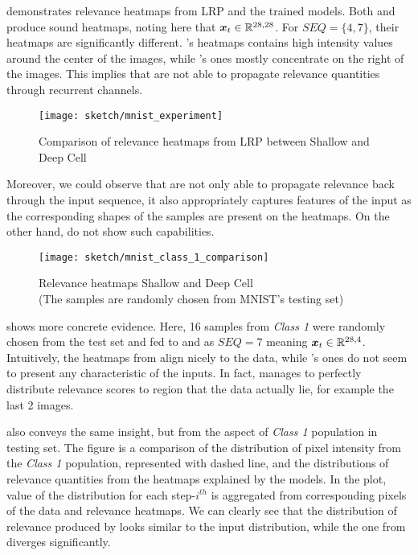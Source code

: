 \addfigure{\ref{fig:mnist_experiment}} demonstrates relevance heatmaps from LRP and the trained models. Both   and  produce sound heatmaps, noting here that $\patvector{x}_t \in \mathbb{R}^{28,28}$. For $SEQ=\{4,7\}$,  their heatmaps are significantly different. 's heatmaps contains high intensity values around the center of the images, while 's ones mostly concentrate on the right of the images.  This implies that  are not able to  propagate relevance quantities through recurrent channels.

 \begin{figure}[h]
\centering
\texttt{[image: sketch/mnist\_experiment]}
\caption{Comparison of relevance heatmaps from LRP between Shallow and Deep Cell}
\label{fig:mnist_experiment}
\end{figure}

Moreover, we could observe that  are not only able to propagate relevance back through the input sequence, it also appropriately captures features of the input as the corresponding shapes of the samples are present on the heatmaps. On the other hand,  do not show such capabilities.


 \begin{figure}[h]
\centering
\texttt{[image: sketch/mnist\_class\_1\_comparison]}
\caption{Relevance heatmaps Shallow and Deep Cell\\(The samples are randomly chosen from MNIST's testing set)} 
\label{fig:mnist_experiment1}
\end{figure}

\addfigure{\ref{fig:mnist_experiment1}} shows more concrete evidence. Here, 16 samples from \textit{Class 1} were randomly chosen from the test set and fed to  and  as  $SEQ=7$ meaning $\patvector{x}_t \in \mathbb{R}^{28,4}$.  Intuitively, the heatmaps from  align nicely to the data, while 's ones  do not seem to present any characteristic of the inputs. In fact,  manages to perfectly distribute relevance scores to region that the data actually lie, for example the last 2 images.  



\addfigure{\ref{fig:mnist_1_dist}}  also conveys the same insight, but from the aspect of  \textit{Class 1} population in testing set. The figure is a comparison of the distribution of pixel intensity from the \textit{Class 1} population, represented with dashed line, and the distributions of relevance quantities from the heatmaps explained by the models.  In the plot, value of the distribution for each step-$i^{th}$ is aggregated from corresponding pixels of the data and relevance heatmaps. We can clearly see that the distribution of relevance produced by   looks similar to the input distribution, while the one from  diverges significantly.


